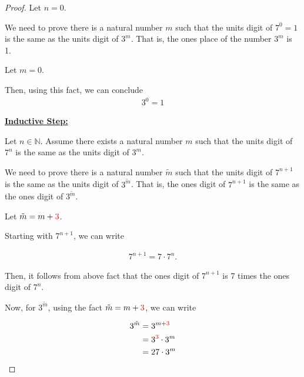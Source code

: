 \documentclass[12pt]{article}
\begin{document}
\begin{itemize}
\begin{mdframed}
\begin{proof}
        \bigskip

        Let $n = 0$.

        \bigskip

        We need to prove there is a natural number $m$ such that the
        units digit of $7^0 = 1$ is the same as the units digit of $3^m$. That is,
        the ones place of the number $3^m$ is 1.

        \bigskip

        Let $m = 0$.

        \bigskip

        Then, using this fact, we can conclude
        \setcounter{equation}{0}
        \begin{align}
            3^0 = 1
        \end{align}

        \bigskip

        \underline{\textbf{Inductive Step:}}

        \bigskip

        Let $n \in \mathbb{N}$. Assume there exists a natural number $m$ such that
        the units digit of $7^n$ is the same as the units digit of $3^m$.

        \bigskip

        We need to prove there is a natural number $\tilde{m}$ such that the
        units digit of $7^{n+1}$ is the same as the units digit of $3^{\tilde{m}}$.
        That is, the ones digit of $7^{n+1}$ is the same as the ones digit of $3^{\tilde{m}}$.

        \bigskip

        Let $\tilde{m} = m + \color{red}3\color{black}$.

        \bigskip

        Starting with $7^{n+1}$, we can write

        \begin{align}
            7^{n+1} = 7 \cdot 7^n.
        \end{align}

        \bigskip

        Then, it follows from above fact that the ones digit of $7^{n+1}$
        is 7 times the ones digit of $7^n$.

        \bigskip

        Now, for $3^{\tilde{m}}$, using the fact $\tilde{m} = m + \color{red}3\color{black}$, we
        can write

        \begin{align}
            3^{\tilde{m}} &= 3^{m+\color{red}3\color{black}}\\
            &= 3^{\color{red}3\color{black}} \cdot 3^m\\
            &= 27 \cdot 3^m
        \end{align}


\end{proof}
\end{mdframed}
\end{itemize}
\end{document}
